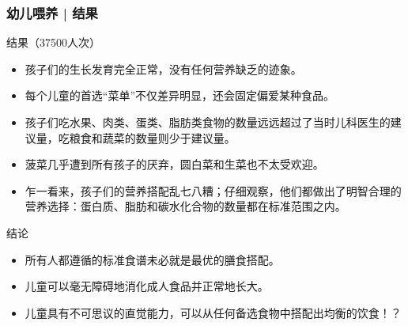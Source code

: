 \begin{frame}
  \frametitle{幼儿喂养 | 结果}
  \vspace{-0.5em}
  \begin{block}{结果（37500人次）}
    \begin{itemize}
      \item 孩子们的生长发育完全正常，没有任何营养缺乏的迹象。
      \item 每个儿童的首选“菜单”不仅差异明显，还会固定偏爱某种食品。
      \item 孩子们吃水果、肉类、蛋类、脂肪类食物的数量远远超过了当时儿科医生的建议量，吃粮食和蔬菜的数量则少于建议量。
      \item 菠菜几乎遭到所有孩子的厌弃，圆白菜和生菜也不太受欢迎。
      \item 乍一看来，孩子们的营养搭配乱七八糟；仔细观察，他们都做出了明智合理的营养选择：蛋白质、脂肪和碳水化合物的数量都在标准范围之内。
    \end{itemize}
  \end{block}
  \vspace{-0.5em}
  \pause
  \begin{block}{结论}
    \begin{itemize}
      \item 所有人都遵循的标准食谱未必就是最优的膳食搭配。
      \item 儿童可以毫无障碍地消化成人食品并正常地长大。
      \item 儿童具有不可思议的直觉能力，可以从任何备选食物中搭配出均衡的饮食\alert{！？}
    \end{itemize}
  \end{block}
\end{frame}

